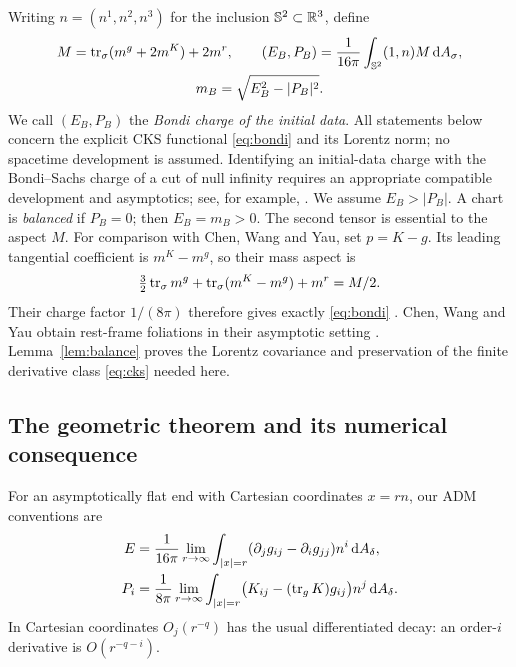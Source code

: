 Writing $n=(n^1,n^2,n^3)$ for the inclusion $\mathbb S^2\subset\mathbb R^3$,
define
\begin{equation}\label{eq:bondi}
 \begin{gathered}
 M=\operatorname{tr}_\sigma(m^g+2m^K)+2m^r,\qquad
 (E_B,P_B)=\frac1{16\pi}\int_{\mathbb S^2}(1,n)M\,\mathrm dA_\sigma,\\
 m_B=\sqrt{E_B^2-|P_B|^2}.
 \end{gathered}
\end{equation}
We call $(E_B,P_B)$ the \emph{Bondi charge of the initial data}.
All statements below concern the explicit CKS functional
\eqref{eq:bondi} and its Lorentz norm; no spacetime development is
assumed. Identifying an initial-data charge with the Bondi--Sachs charge
of a cut of null infinity requires an appropriate compatible
development and asymptotics; see, for example,
\cite[Theorem~5.3]{CJL}. We assume $E_B>|P_B|$.
A chart is \emph{balanced} if $P_B=0$;
then $E_B=m_B>0$. The second tensor is essential to the aspect $M$.
For comparison with Chen, Wang and Yau, set $p=K-g$. Its leading
tangential coefficient is $m^K-m^g$, so their mass aspect is
\[
 \tfrac32\operatorname{tr}_\sigma m^g+\operatorname{tr}_\sigma(m^K-m^g)+m^r=M/2.
\]
Their charge factor $1/(8\pi)$ therefore gives exactly
\eqref{eq:bondi} \cite[Definitions~1.3--1.4]{CWY}.
Chen, Wang and Yau obtain rest-frame foliations in their asymptotic
setting \cite[Corollary~4.3]{CWY}. Lemma~\ref{lem:balance} proves the
Lorentz covariance and preservation of the finite derivative class
\eqref{eq:cks} needed here.

\subsection{The geometric theorem and its numerical consequence}
For an asymptotically flat end with Cartesian coordinates $x=rn$,
our ADM conventions are
\begin{align}
 E&=\frac1{16\pi}\lim_{r\to\infty}\int_{|x|=r}
 (\partial_jg_{ij}-\partial_ig_{jj})n^i\,\mathrm dA_\delta,
 \label{eq:adm-energy}\\
 P_i&=\frac1{8\pi}\lim_{r\to\infty}\int_{|x|=r}
 \bigl(K_{ij}-(\operatorname{tr}_gK)g_{ij}\bigr)n^j\,\mathrm dA_\delta.
 \label{eq:adm-momentum}
\end{align}
In Cartesian coordinates $O_j(r^{-q})$ has the usual differentiated
decay: an order-$i$ derivative is $O(r^{-q-i})$.

